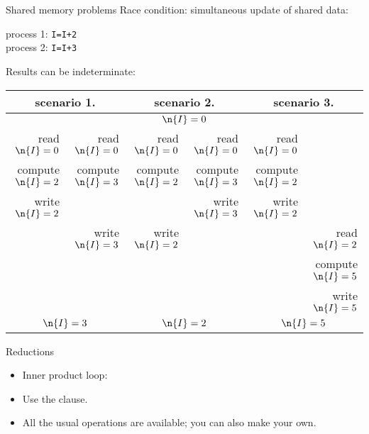 \begin{numberedframe}{Shared memory problems}
Race condition: simultaneous update of shared data:
\begin{tabbing}
  process 1: \texttt{I=I+2}\\
  process 2: \texttt{I=I+3}
\end{tabbing}
Results can be indeterminate:

\tiny
\begin{tabular}{|rr|rr|rr|}
  \hline
  \multicolumn{2}{|c|}{scenario 1.}& \multicolumn{2}{|c|}{scenario 2.}&
  \multicolumn{2}{|c|}{scenario 3.}\\ \hline
  \multicolumn{6}{|c|}{$\n{I}=0$}\\ \hline
  read $\n{I}=0$&read $\n{I}=0$&
    read $\n{I}=0$&read $\n{I}=0$&
      read $\n{I}=0$& \\
  compute $\n{I}=2$&compute $\n{I}=3$& 
    compute $\n{I}=2$&compute $\n{I}=3$&
      compute $\n{I}=2$& \\
  write $\n{I}=2$& & &write $\n{I}=3$&write $\n{I}=2$& \\
  &write $\n{I}=3$&write $\n{I}=2$& & &read $\n{I}=2$\\
  &&&&&compute $\n{I}=5$\\
  &&&&&write $\n{I}=5$\\
  \hline
  \multicolumn{2}{|c|}{$\n{I}=3$}& \multicolumn{2}{|c|}{$\n{I}=2$}&
  \multicolumn{2}{|c|}{$\n{I}=5$}\\ \hline
\end{tabular}
\end{numberedframe}

\begin{numberedframe}{Reductions}
  \begin{itemize}
  \item Inner product loop:
  \item Use the  clause.
  \item All the usual operations are available; you can also make your own.
  \end{itemize}
\end{numberedframe}

\begin{exerciseframe}[pi]
  \footnotesize
  
\end{exerciseframe}

\begin{exerciseframe}[piadapt]
  \footnotesize
  
\end{exerciseframe}

